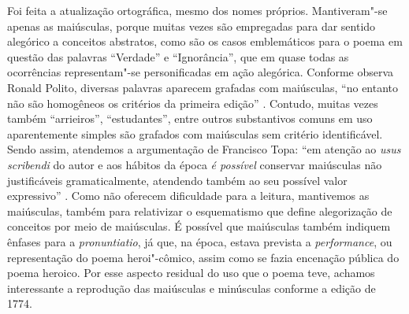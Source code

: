 Foi feita a atualização ortográfica, mesmo dos nomes próprios. Mantiveram"-se
apenas as maiúsculas, porque muitas vezes são empregadas para dar sentido
alegórico a conceitos abstratos, como são os casos emblemáticos para o poema
em questão das palavras ``Verdade'' e ``Ignorância'', que em quase todas as
ocorrências representam"-se personificadas em ação alegórica.
Conforme observa Ronald Polito, diversas palavras aparecem grafadas com maiúsculas,
``no entanto não são homogêneos os critérios da primeira edição'' \cite[p. 61]{polito}.
Contudo, muitas vezes também ``arrieiros'', ``estudantes'', entre outros substantivos
comuns em uso aparentemente simples são grafados com maiúsculas sem critério identificável.
Sendo assim, atendemos a argumentação de Francisco Topa: ``em atenção ao \textit{usus
scribendi} do autor e aos hábitos da época \textit{é possível} conservar maiúsculas
não justificáveis gramaticalmente, atendendo também ao seu possível valor expressivo'' \cite[p. 19]{topa}.
Como não oferecem dificuldade para a leitura, mantivemos as maiúsculas,
também para relativizar o esquematismo que define alegorização de conceitos por
meio de maiúsculas. É possível que maiúsculas também indiquem ênfases para a
\textit{pronuntiatio}, já que, na época, estava prevista a \textit{performance},
ou representação do poema heroi"-cômico, assim como se fazia encenação pública do
poema heroico. Por esse aspecto residual do uso que o poema teve, achamos interessante
a reprodução das maiúsculas e minúsculas conforme a edição de 1774. %


